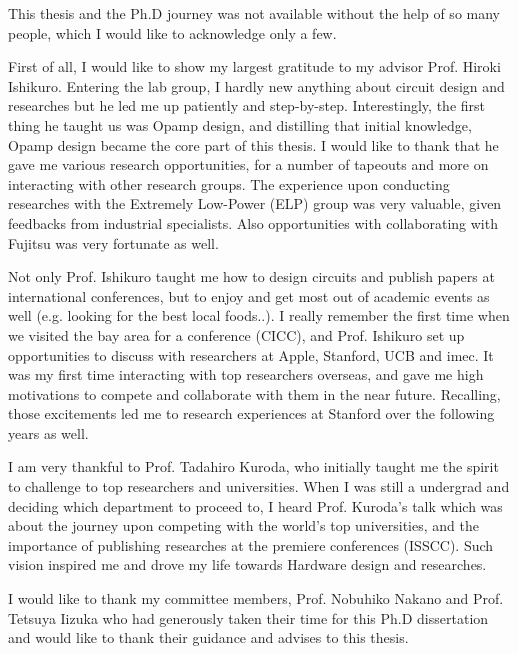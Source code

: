 This thesis and the Ph.D journey was not available without the help of so many people, which I would like to acknowledge only a few.

First of all, I would like to show my largest gratitude to my advisor Prof. Hiroki Ishikuro.
Entering the lab group, I hardly new anything about circuit design and researches but he led me up patiently and step-by-step. Interestingly, the first thing he taught us was Opamp design, and distilling that initial knowledge, Opamp design became the core part of this thesis. I would like to thank that he gave me various research opportunities, for a number of tapeouts and more on interacting with other research groups. The experience upon conducting researches with the Extremely Low-Power (ELP) group was very valuable, given feedbacks from industrial specialists. Also opportunities with collaborating with Fujitsu was very fortunate as well.

Not only Prof. Ishikuro taught me how to design circuits and publish papers at international conferences, but to enjoy and get most out of academic events as well (e.g. looking for the best local foods..). I really remember the first time when we visited the bay area for a conference (CICC), and Prof. Ishikuro set up opportunities to discuss with researchers at Apple, Stanford, UCB and imec. It was my first time interacting with top researchers overseas, and gave me high motivations to compete and collaborate with them in the near future. Recalling, those excitements led me to research experiences at Stanford over the following years as well.

I am very thankful to Prof. Tadahiro Kuroda, who initially taught me the spirit to challenge to top researchers and universities.
When I was still a undergrad and deciding which department to proceed to, I heard Prof. Kuroda's talk which was about the journey upon competing with the world's top universities, and the importance of publishing researches at the premiere conferences (ISSCC). Such vision inspired me and drove my life towards Hardware design and researches. %

I would like to thank my committee members, Prof. Nobuhiko Nakano and Prof. Tetsuya Iizuka who had generously taken their time for this Ph.D dissertation and would like to thank their guidance and advises to this thesis. 

